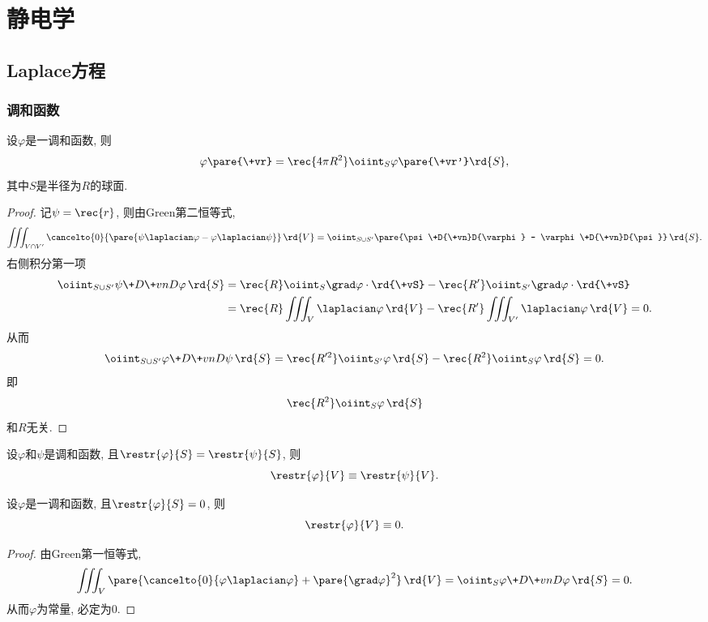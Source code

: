 \documentclass[hidelinks]{ctexart}
\begin{document}
\section{静电学} %
\label{sec:静电学}

\subsection{Laplace方程} %
\label{sub:laplace方程}

\subsubsection{调和函数} %
\label{ssub:调和函数}

\begin{theorem}[平均值定理]
    设$\varphi$是一调和函数, 则
    \[ \varphi\pare{\+vr} = \rec{4\pi R^2}\oiint_S \varphi\pare{\+vr'}\rd{S}, \]
    其中$S$是半径为$R$的球面.
\end{theorem}
\begin{proof}
    记$\displaystyle \psi = \rec{r}$, 则由Green第二恒等式,
    \[ \iiint_{V\cap V'} \cancelto{0}{\pare{\psi\laplacian \varphi - \varphi\laplacian \psi}}\,\rd{V} = \oiint_{S\cup S'} \pare{\psi\+D{\+vn}D{\varphi} - \varphi\+D{\+vn}D{\psi}}\,\rd{S}. \]
    右侧积分第一项
    \begin{align*}
        \oiint_{S\cup S'} \psi\+D{\+vn}D{\varphi}\,\rd{S} &= \rec{R} \oiint_{S} \grad\varphi\cdot\rd{\+vS} - \rec{R'} \oiint_{S'}\grad\varphi\cdot\rd{\+vS} \\ &= \rec{R} \iiint_{V} \laplacian \varphi\,\rd{V} - \rec{R'} \iiint_{V'} \laplacian \varphi\,\rd{V} = 0. 
    \end{align*}
    从而
    \[ \oiint_{S\cup S'} \varphi\+D{\+vn}D{\psi}\,\rd{S} = \rec{R'^2} \oiint_{S'}\varphi\,\rd{S} - \rec{R^2}\oiint_{S} \varphi\,\rd{S} = 0. \]
    即
    \[ \rec{R^2}\oiint_{S} \varphi\,\rd{S} \]
    和$R$无关.
\end{proof}
\begin{theorem}[唯一性定理]
    设$\varphi$和$\psi$是调和函数, 且$\restr{\varphi}{S} = \restr{\psi}{S}$, 则
    \[ \restr{\varphi}{V} \equiv \restr{\psi}{V}. \]
\end{theorem}
\begin{lemma}
    设$\varphi$是一调和函数, 且$\restr{\varphi}{S} = 0$, 则
    \[ \restr{\varphi}{V} \equiv 0. \]
\end{lemma}
\begin{proof}
    由Green第一恒等式,
    \[ \iiint_V \pare{\cancelto{0}{\varphi\laplacian \varphi} + \pare{\grad\varphi}^2}\,\rd{V} = \oiint_{S} {\varphi\+D{\+vn}D{\varphi}}\,\rd{S} = 0. \]
    从而$\varphi$为常量, 必定为$0$.
\end{proof}





\end{document}
